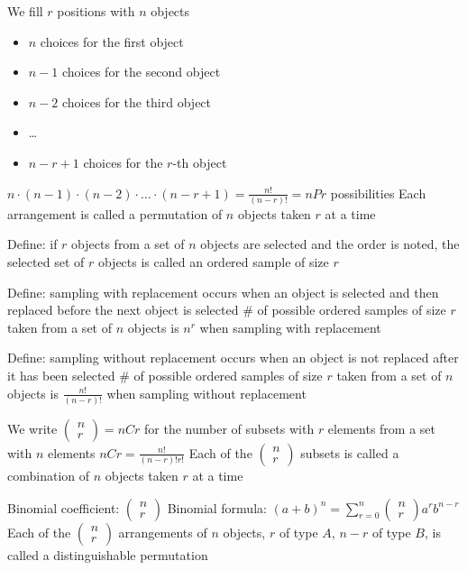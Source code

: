 \documentclass{article}
\begin{document}
We fill $r$ positions with $n$ objects
\begin{itemize}
    \item $n$ choices for the first object
    \item $n-1$ choices for the second object
    \item $n-2$ choices for the third object
    \item \dots
    \item $n-r+1$ choices for the $r$-th object
\end{itemize}
$n\cdot(n-1)\cdot(n-2)\cdot\dots\cdot(n-r+1)=\frac{n!}{(n-r)!}=nPr$ possibilities
Each arrangement is called a permutation of $n$ objects taken $r$ at a time

Define: if $r$ objects from a set of $n$ objects are selected and the order is noted, the selected set of $r$ objects is called an ordered sample of size $r$

Define: sampling with replacement occurs when an object is selected and then replaced before the next object is selected
# of possible ordered samples of size $r$ taken from a set of $n$ objects is $n^r$ when sampling with replacement

Define: sampling without replacement occurs when an object is not replaced after it has been selected
# of possible ordered samples of size $r$ taken from a set of $n$ objects is $\frac{n!}{(n-r)!}$ when sampling without replacement

We write $\begin{pmatrix}
    n\\r
\end{pmatrix}=nCr$ for the number of subsets with $r$ elements from a set with $n$ elements
$nCr=\frac{n!}{(n-r)!r!}$
Each of the $\begin{pmatrix}
    n\\r
\end{pmatrix}$ subsets is called a combination of $n$ objects taken $r$ at a time

Binomial coefficient: $\begin{pmatrix}
    n\\r
\end{pmatrix}$
Binomial formula: $(a+b)^n=\sum_{r=0}^n\begin{pmatrix}
    n\\r
\end{pmatrix}a^rb^{n-r}$
Each of the $\begin{pmatrix}
    n\\r
\end{pmatrix}$ arrangements of $n$ objects, $r$ of type $A$, $n-r$ of type $B$, is called a distinguishable permutation
\end{document}
